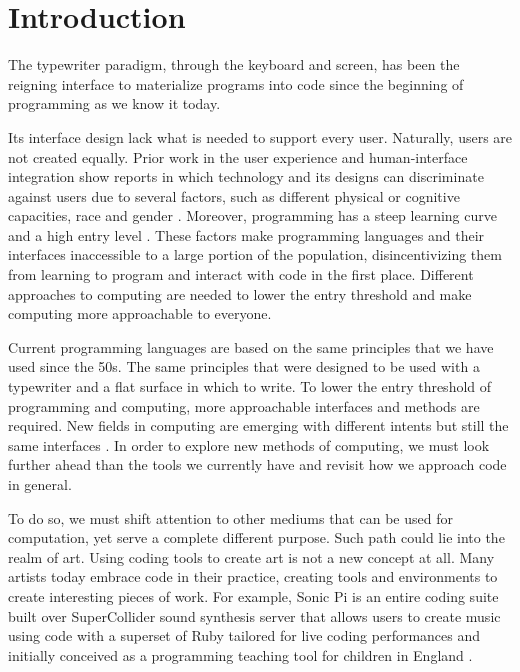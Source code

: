 
\chapter{Introduction}
\label{cha:introduction}
The typewriter paradigm, through the keyboard and screen, has been the reigning interface to materialize programs into code since the beginning of programming as we know it today.

Its interface design lack what is needed to support every user. Naturally, users are not created equally.
Prior work in the user experience and human-interface integration show reports in which technology and its designs can discriminate
against users due to several factors, such as different physical or cognitive capacities, race and gender \cite{ko23}.
Moreover, programming has a steep learning curve and a high entry level \cite{bosse17}.
These factors make programming languages and their interfaces inaccessible to a large portion of the population,
disincentivizing them from learning to program and interact with code in the first place.
Different approaches to computing are needed to lower the entry threshold and make computing more approachable to everyone.

Current programming languages are based on the same principles that we have used since the 50s.
The same principles that were designed to be used with a typewriter and a flat surface in which to write.
To lower the entry threshold of programming and computing, more approachable interfaces and methods are required.
New fields in computing are emerging with different intents but still the same interfaces \cite{hongji16}.
In order to explore new methods of computing, we must look further ahead than the tools we currently have and revisit how we approach code in general.

To do so, we must shift attention to other mediums that can be used for computation, yet serve a complete different purpose.
Such path could lie into the realm of art. Using coding tools to create art is not a new concept at all.
Many artists today embrace code in their practice, creating tools and environments to create interesting pieces of work. 
For example, Sonic Pi is an entire coding suite built over SuperCollider sound synthesis server that allows users to create music using code with a superset of Ruby 
tailored for live coding performances and initially conceived as a programming teaching tool for children in England \cite{aaron16}.


